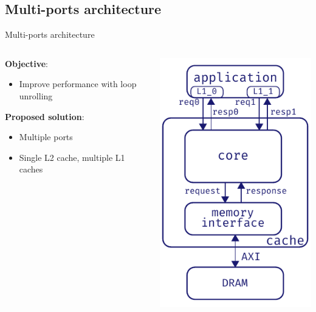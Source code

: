 \documentclass[aspectratio=169]{beamer}
\begin{document}
\subsection{Multi-ports architecture}
\begin{frame}{Multi-ports architecture}
	\begin{columns}
		\begin{column}{.5\textwidth}
			\textbf{Objective}:
			\begin{itemize}
				\item Improve performance with loop unrolling
			\end{itemize}

			\bigskip
			\textbf{Proposed solution}:
			\begin{itemize}
				\item Multiple ports
				\item Single L2 cache, multiple L1 caches
			\end{itemize}
		\end{column}
		\begin{column}{.5\textwidth}
			\begin{center}
			\includegraphics[height=.7\textheight]{multi_ports_arch}
			\end{center}
		\end{column}
	\end{columns}
\end{frame}
\end{document}
